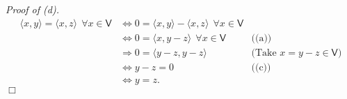 \documentclass{article}
\begin{document}
\emph{Proof of (d).}
\begin{align*}
  \langle x,y \rangle = \langle x,z \rangle \:\: \forall x \in \mathsf{V}
  &\Longleftrightarrow
  0 = \langle x,y \rangle - \langle x,z \rangle \:\: \forall x \in \mathsf{V} \\
  &\Longleftrightarrow
  0 = \langle x,y-z \rangle \:\: \forall x \in \mathsf{V}
    &\text{((a))} \\
  &\Longrightarrow
  0 = \langle y-z,y-z \rangle
    &\text{(Take $x=y-z \in \mathsf{V}$)} \\
  &\Longleftrightarrow
  y-z = 0
    &\text{((c))} \\
  &\Longleftrightarrow
  y = z.
\end{align*}
$\Box$ \\\\



\end{document}
